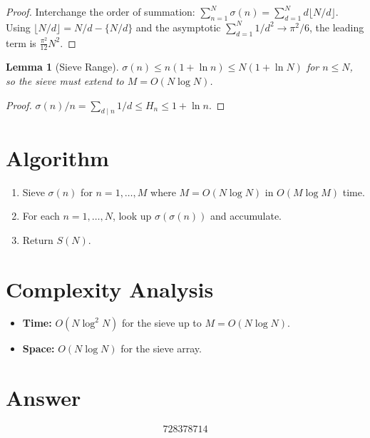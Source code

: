 \documentclass[11pt]{article}
\newtheorem{lemma}[theorem]{Lemma}
\begin{document}
\begin{proof}
Interchange the order of summation: $\sum_{n=1}^N \sigma(n) = \sum_{d=1}^N d\lfloor N/d\rfloor$. Using $\lfloor N/d\rfloor = N/d - \{N/d\}$ and the asymptotic $\sum_{d=1}^N 1/d^2 \to \pi^2/6$, the leading term is $\frac{\pi^2}{12}N^2$.
\end{proof}

\begin{lemma}[Sieve Range]
$\sigma(n)\le n(1+\ln n)\le N(1+\ln N)$ for $n\le N$, so the sieve must extend to $M=O(N\log N)$.
\end{lemma}

\begin{proof}
$\sigma(n)/n = \sum_{d\mid n}1/d \le H_n \le 1+\ln n$.
\end{proof}

\section{Algorithm}

\begin{enumerate}
\item Sieve $\sigma(n)$ for $n=1,\ldots,M$ where $M=O(N\log N)$ in $O(M\log M)$ time.
\item For each $n=1,\ldots,N$, look up $\sigma(\sigma(n))$ and accumulate.
\item Return $S(N)$.
\end{enumerate}

\section{Complexity Analysis}

\begin{itemize}
\item \textbf{Time:} $O(N\log^2 N)$ for the sieve up to $M=O(N\log N)$.
\item \textbf{Space:} $O(N\log N)$ for the sieve array.
\end{itemize}

\section{Answer}

\[
\boxed{728378714}
\]
\end{document}
